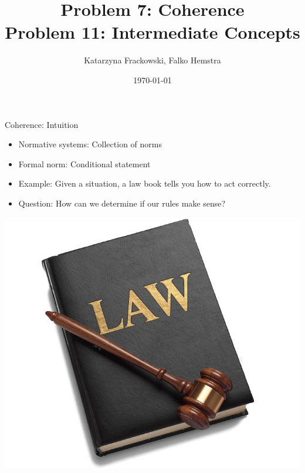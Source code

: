 \documentclass[]{beamer}
\title[]{Problem 7: Coherence\\Problem 11: Intermediate Concepts}
\author{Katarzyna Frackowski, Falko Hemstra}
\institute{}
\date{\today}
\begin{document}
\addtocounter{framenumber}{-1}
\begin{frame}[plain]
  \titlepage
\end{frame}


\begin{frame}{Coherence: Intuition}
    \begin{minipage}{.65\textwidth}
        \begin{itemize}
            \item Normative systems: Collection of norms
            \item Formal norm: Conditional statement
            \item Example: Given a situation, a law book tells you how to act correctly.
            \item Question: How can we determine if our rules make sense?
        \end{itemize}
    \end{minipage}\hspace{.5cm}%
    \begin{minipage}{.3\textwidth}
        \begin{center}
            \includegraphics[width=\textwidth]{images/law_book.jpg}
        \end{center}
    \end{minipage}%
\end{frame}
\end{document}
